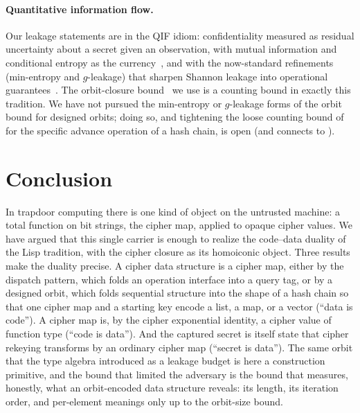 \documentclass[11pt]{article}
\theoremstyle{definition}
\theoremstyle{plain}
\theoremstyle{definition}
\theoremstyle{remark}
\begin{document}
\paragraph{Quantitative information flow.} Our leakage statements are
in the QIF idiom: confidentiality measured as residual uncertainty
about a secret given an observation, with mutual information and
conditional entropy as the currency~\cite{shannon1948mathematical}, and
with the now-standard refinements (min-entropy and $g$-leakage) that
sharpen Shannon leakage into operational
guarantees~\cite{smith2009foundations}. The orbit-closure
bound~\cite{towell2026algebraic} we use is a counting bound in exactly
this tradition. We have not pursued the min-entropy or $g$-leakage
forms of the orbit bound for designed orbits; doing so, and tightening
the loose counting bound of  for the specific
advance operation of a hash chain, is open (and connects to
).

\section{Conclusion}
\label{sec:conclusion}

In trapdoor computing there is one kind of object on the untrusted
machine: a total function on bit strings, the cipher map, applied to
opaque cipher values. We have argued that this single carrier is enough
to realize the code--data duality of the Lisp tradition, with the
cipher closure as its homoiconic object. Three results make the
duality precise. A cipher data structure is a cipher map, either by the
dispatch pattern, which folds an operation interface into a query tag,
or by a designed orbit, which folds sequential structure into the shape
of a hash chain so that one cipher map and a starting key encode a
list, a map, or a vector (\enquote{data is code}). A cipher map is, by
the cipher exponential identity, a cipher value of function type
(\enquote{code is data}). And the captured secret is itself state that
cipher rekeying transforms by an ordinary cipher map (\enquote{secret
is data}). The same orbit that the type algebra introduced as a leakage
budget is here a construction primitive, and the bound that limited the
adversary is the bound that measures, honestly, what an orbit-encoded
data structure reveals: its length, its iteration order, and per-element
meanings only up to the orbit-size bound.
\end{document}
